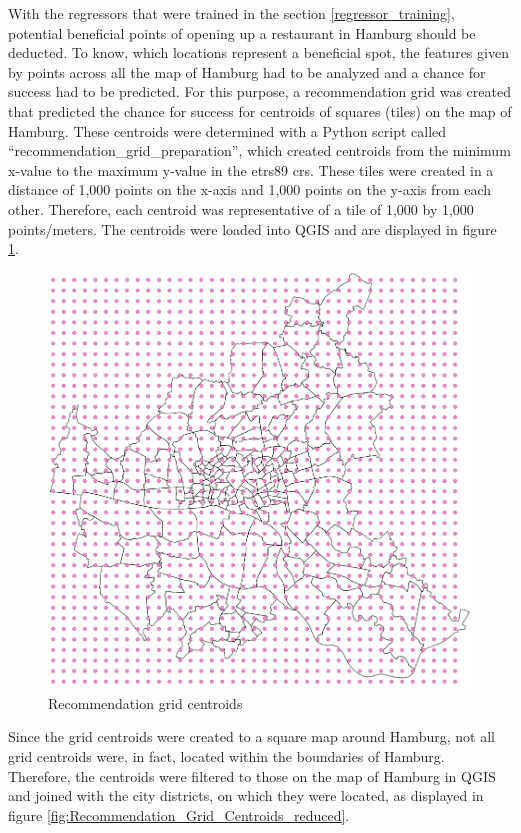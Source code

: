 \documentclass[a4paper, 11pt, oneside]{Thesis}  %
\begin{document}
With the regressors that were trained in the section \ref{regressor_training}, potential beneficial points of opening up a restaurant in Hamburg should be deducted. To know, which locations represent a beneficial spot, the features given by points across all the map of Hamburg had to be analyzed and a chance for success had to be predicted. For this purpose, a recommendation grid was created that predicted the chance for success for centroids of squares (tiles) on the map of Hamburg. These centroids were determined with a Python script called ``recommendation\_grid\_preparation'', which created centroids from the minimum x-value to the maximum y-value in the \ac{etrs89} \ac{crs}. These tiles were created in a distance of 1,000 points on the x-axis and 1,000 points on the y-axis from each other. Therefore, each centroid was representative of a tile of 1,000 by 1,000 points/meters. The centroids were loaded into QGIS and are displayed in figure \ref{fig:Recommendation_Grid_Centroids}.

\begin{figure}[h]
\includegraphics[scale=0.7]{Figures/Recommendation_map/Recommendation_Grid_Centroids.png}
\centering
\caption{Recommendation grid centroids}
\label{fig:Recommendation_Grid_Centroids}
\end{figure}

Since the grid centroids were created to a square map around Hamburg, not all grid centroids were, in fact, located within the boundaries of Hamburg. Therefore, the centroids were filtered to those on the map of Hamburg in QGIS and joined with the city districts, on which they were located, as displayed in figure \ref{fig:Recommendation_Grid_Centroids_reduced}.
\end{document}
